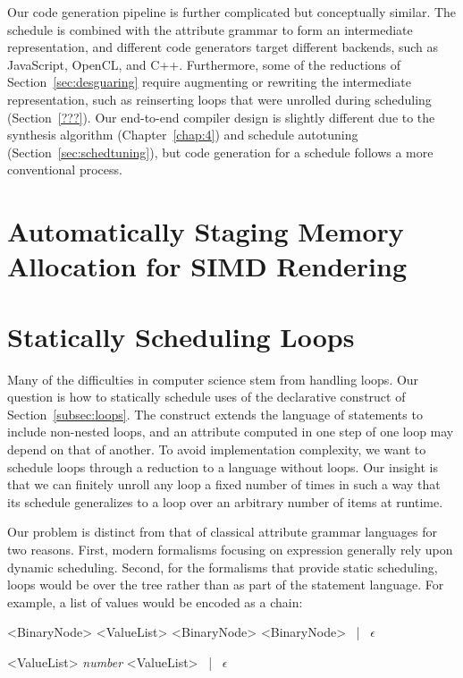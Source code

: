 Our code generation pipeline is further complicated but conceptually similar. The schedule is combined with the attribute grammar to form an intermediate representation, and different code generators target different backends, such as JavaScript, OpenCL, and C++. Furthermore, some of the reductions of Section~\ref{sec:desguaring} require augmenting or rewriting the intermediate representation, such as reinserting loops that were unrolled during scheduling (Section~\ref{???}). Our end-to-end compiler design is slightly different due to the synthesis algorithm (Chapter~\ref{chap:4})  and schedule autotuning (Section~\ref{sec:schedtuning}), but code generation for a schedule follows a more conventional process.


\section{Automatically Staging Memory Allocation for SIMD Rendering}




\section{Statically Scheduling Loops}
\label{sec:loopscheduling}
Many of the difficulties in computer science stem from handling loops.  Our question is how to statically schedule uses of the declarative construct of Section~\ref{subsec:loops}. The construct extends the language of statements to include non-nested loops, and an attribute computed in one step of one loop may depend on that of another. To avoid implementation complexity, we want to schedule loops through a reduction to a language without loops. Our insight is that we can finitely unroll any loop a fixed number of times in such a way that its schedule generalizes to a loop over an arbitrary number of items at runtime.
 
Our problem is distinct from that of classical attribute grammar languages for two reasons. First, modern formalisms focusing on expression generally rely upon dynamic scheduling. Second, for the formalisms that provide static scheduling, loops would be over the tree rather than as part of the statement language. For example, a list of values would be encoded as a chain:


\begin{minipage}{1\columnwidth}
\renewcommand{\litleft}{\bfseries}
\renewcommand{\ulitleft}{\bfseries}
\renewcommand{\superscript}[1]{\ensuremath{^{\textrm{#1}}}}
\renewcommand{\subscript}[1]{\ensuremath{_{\textrm{\uppercase{#1}}}}}
\renewcommand{\syntleft}{\normalfont\itshape\texttt{<}}
\renewcommand{\syntright}{\texttt{>}}
\begin{grammar}
<BinaryNode> \deriv{} <ValueList> <BinaryNode> <BinaryNode> ~|~ $\epsilon$

<ValueList> \deriv{} \emph{number} <ValueList>  ~|~ $\epsilon$
\end{grammar}
\end{minipage}


